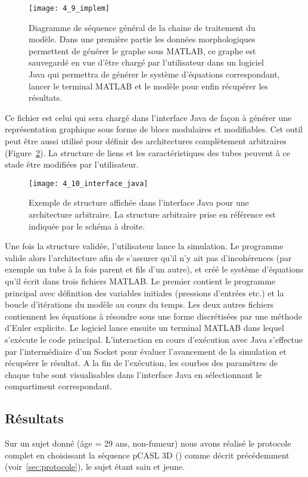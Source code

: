 \vspace{0.4cm}
\begin{figure}[!b]
\centering
\texttt{[image: 4\_9\_implem]}
\caption{Diagramme de séquence général de la chaine de traitement du modèle. Dans une première partie les données
morphologiques permettent de générer le graphe sous MATLAB, ce graphe est sauvegardé en vue d’être chargé par
l’utilisateur dans un logiciel Java qui permettra de générer le système d’équations correspondant, lancer le terminal MATLAB
et le modèle pour enfin récupérer les résultats.}
\label{fig:4_9_implem}	
\end{figure}
Ce fichier est celui qui sera chargé dans l’interface Java de façon à générer une représentation
graphique sous forme de blocs modulaires et modifiables. Cet outil peut être aussi utilisé pour définir
des architectures complètement arbitraires (Figure~\ref{fig:4_10_interface_java}). La structure de liens et les caractéristiques des
tubes peuvent à ce stade être modifiées par l’utilisateur.

\begin{figure}[!t]
\centering
\texttt{[image: 4\_10\_interface\_java]}
\caption{Exemple de structure affichée dans l'interface Java pour une architecture arbitraire. La structure arbitraire prise
en référence est indiquée par le schéma à droite.}
\label{fig:4_10_interface_java}	
\end{figure}
Une fois la structure validée, l’utilisateur lance la simulation. Le programme valide alors
l’architecture afin de s’assurer qu’il n’y ait pas d’incohérences (par exemple un tube à la fois parent et
fils d’un autre), et créé le système d’équations qu’il écrit dans trois fichiers MATLAB. Le premier
contient le programme principal avec définition des variables initiales (pressions d’entrées etc.) et la
boucle d’itérations du modèle au cours du temps. Les deux autres fichiers contiennent les équations à
résoudre sous une forme discrétisées par une méthode d’Euler explicite. Le logiciel lance ensuite un
terminal MATLAB dans lequel s’exécute le code principal. L’interaction en cours d’exécution avec Java
s’effectue par l’intermédiaire d’un Socket pour évaluer l’avancement de la simulation et récupérer le
résultat. A la fin de l’exécution, les courbes des paramètres de chaque tube sont visualisables dans
l’interface Java en sélectionnant le compartiment correspondant.

\subsection{Résultats}
Sur un sujet donné (âge = 29 ans, non-fumeur) nous avons réalisé le protocole complet en
choisissant la séquence pCASL 3D (\cite{Wu2007}) comme décrit précédemment (voir~\ref{sec:protocole}), le sujet étant sain et
jeune.

